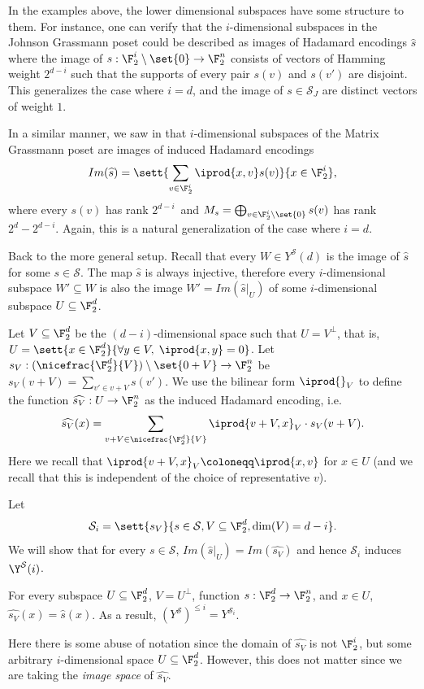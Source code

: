 In the examples above, the lower dimensional subspaces have some structure to them. For instance, one can verify that the \(i\)-dimensional subspaces in the Johnson Grassmann poset could be described as images of Hadamard encodings \(\widehat{s}\) where the image of \(s:\F_2^{i}\setminus\set{0} \to \F_2^n\) consists of vectors of Hamming weight \(2^{d-i}\) such that the supports of every pair \(s(v)\) and \(s(v')\) are disjoint. This generalizes the case where \(i=d\), and the image of \(s \in \mathcal{S}_J\) are distinct vectors of weight \(1\).

In a similar manner, we saw in  that \(i\)-dimensional subspaces of the Matrix Grassmann poset are images of induced Hadamard encodings
\[
    Im(\widehat{s}) = \sett{\sum_{v \in \F_2^{i}}\iprod{x,v} s(v)}{x \in \F_2^{i}},
\]
where every \(s(v)\) has rank \(2^{d-i}\)\, and \(M_s = \bigoplus_{v \in \F_2^{i} \setminus \set{0}} s(v)\) has rank \(2^d-2^{d-i}\). Again, this is a natural generalization of the case where \(i=d\).

Back to the more general setup. Recall that every \(W \in Y^{\mathcal{S}}(d)\) is the image of \(\widehat{s}\) for some \(s \in \mathcal{S}\). The map \(\widehat{s}\) is always injective, therefore every \(i\)-dimensional subspace \(W' \subseteq W\) is also the image \(W' = Im(\widehat{s}|_{U})\) of some \(i\)-dimensional subspace \(U \subseteq \F_2^d\). 

Let \(V \subseteq \F_2^d\) be the \((d-i)\)-dimensional space such that \(U=V^\perp\), that is, \(U = \sett{x \in \F_2^d}{\forall y \in V, \; \iprod{x,y} = 0}\). Let \(s_V:(\nicefrac{\F_2^d}{V}) \setminus \set{0+V} \to \F_2^n\) be \(s_V(v+V) = \sum_{v' \in v+V} s(v')\). We use the bilinear form \(\iprod{}_V\) to define the function \(\widehat{s_V}:U \to \F_2^n\) as the induced Hadamard encoding, i.e.\
\[\widehat{s_V}(x) = \sum_{v+V \in \nicefrac{\F_2^d}{V}} \iprod{v+V,x}_V \cdot s_V(v+V).\]
Here we recall that $\iprod{v+V,x}_V \coloneqq \iprod{x,v}$ for $x\in U$ (and we recall that this is independent of the choice of representative \(v\)).

Let
\[\mathcal{S}_i = \sett{s_V}{s \in \mathcal{S}, V \subseteq \F_2^d, \dim(V)=d-i}.\]
We will show that for every \(s \in \mathcal{S}\), \(Im(\widehat{s}|_U) = Im(\widehat{s_V})\) and hence \(\mathcal{S}_i\) induces \(\Y^{\mathcal{S}}(i)\).

\begin{claim} \label{claim:skeleton-of-induced-Grassmann}
    For every subspace \(U \subseteq \F_2^d\), \(V = U^\bot\), function \(s:\F_2^d \to \F_2^n\), and \(x \in U\), \(\widehat{s_V}(x)=\widehat{s}(x)\). As a result, \((Y^{\mathcal{S}})^{\leq i} = Y^{\mathcal{S}_i}\).
\end{claim}
Here there is some abuse of notation since the domain of \(\widehat{s_V}\) is not \(\F_2^i\), but some arbitrary \(i\)-dimensional space \(U \subseteq \F_2^d\). However, this does not matter since we are taking the \emph{image space} of \(\widehat{s_V}\).

